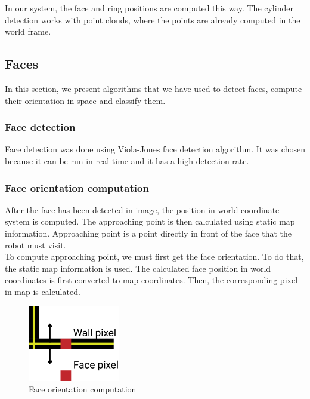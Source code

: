 \documentclass[12pt,a4paper]{article}
\begin{document}
	In our system, the face and ring positions are computed this way. The cylinder detection works with point clouds, where the points are already computed in the world frame.
	
	\subsection{Faces}
	In this section, we present algorithms that we have used to detect faces, compute their orientation in space and classify them.
	
	\subsubsection{Face detection}
	
	Face detection was done using Viola-Jones face detection algorithm. It was chosen because it can be run in real-time and it has a high detection rate. \\
	
	
	
	
	\subsubsection{Face orientation computation}
	After the face has been detected in image, the position in world coordinate system is computed. The approaching point is then calculated using static map information. Approaching point is a point directly in front of the face that the robot must visit. \\
	
	To compute approaching point, we must first get the face orientation. To do that, the static map information is used. The calculated face position in world coordinates is first converted to map coordinates. Then, the corresponding pixel in map is calculated. \\
	
	\begin{figure}[h]
		\centering
		\includegraphics[width=4cm]{images/orientation_computation}
		\caption{Face orientation computation}
		\label{fig:orientation_computation}
	\end{figure}
	
\end{document}
